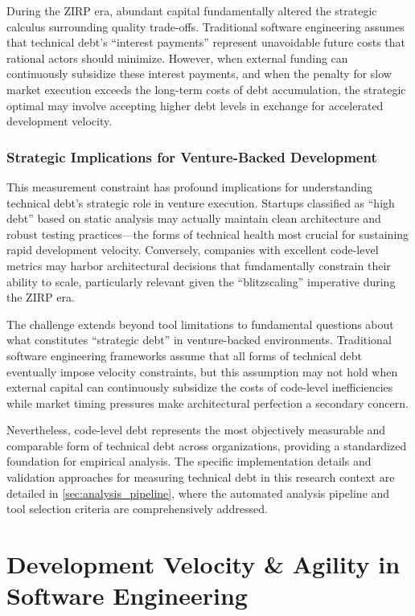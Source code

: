 During the \ac{ZIRP} era, abundant capital fundamentally altered the strategic calculus surrounding quality trade-offs. Traditional software engineering assumes that technical debt's ``interest payments'' represent unavoidable future costs that rational actors should minimize. However, when external funding can continuously subsidize these interest payments, and when the penalty for slow market execution exceeds the long-term costs of debt accumulation, the strategic optimal may involve accepting higher debt levels in exchange for accelerated development velocity.

\subsubsection{Strategic Implications for Venture-Backed Development}

This measurement constraint has profound implications for understanding technical debt's strategic role in venture execution. Startups classified as ``high debt'' based on static analysis may actually maintain clean architecture and robust testing practices—the forms of technical health most crucial for sustaining rapid development velocity. Conversely, companies with excellent code-level metrics may harbor architectural decisions that fundamentally constrain their ability to scale, particularly relevant given the ``blitzscaling'' imperative during the \ac{ZIRP} era.

The challenge extends beyond tool limitations to fundamental questions about what constitutes ``strategic debt'' in venture-backed environments. Traditional software engineering frameworks assume that all forms of technical debt eventually impose velocity constraints, but this assumption may not hold when external capital can continuously subsidize the costs of code-level inefficiencies while market timing pressures make architectural perfection a secondary concern.

Nevertheless, code-level debt represents the most objectively measurable and comparable form of technical debt across organizations, providing a standardized foundation for empirical analysis. The specific implementation details and validation approaches for measuring technical debt in this research context are detailed in \autoref{sec:analysis_pipeline}, where the automated analysis pipeline and tool selection criteria are comprehensively addressed.

\section{Development Velocity \& Agility in Software Engineering}\label{sec:velocity_literature}

